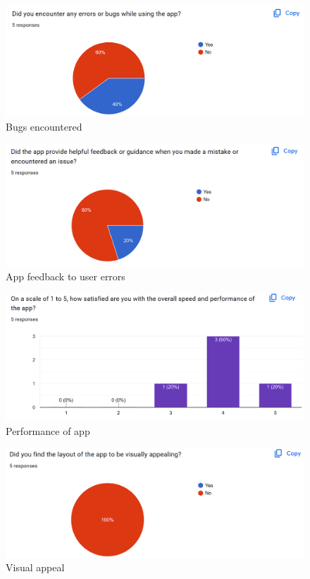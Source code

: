 \documentclass[12pt, titlepage]{article}
\begin{document}
\begin{figure}[H]
    \centering
    \includegraphics[width=1\linewidth]{Usability_3.png}
    \caption{Bugs encountered}
    \label{fig: Bugs encountered}
\end{figure}

\begin{figure}[H]
    \centering
    \includegraphics[width=1\linewidth]{Usability_4.png}
    \caption{App feedback to user errors}
    \label{fig: App feedback to user errors}
\end{figure}

\begin{figure}[H]
    \centering
    \includegraphics[width=1\linewidth]{Usability_5.png}
    \caption{Performance of app}
    \label{fig: Performance of app}
\end{figure}

\begin{figure}[H]
    \centering
    \includegraphics[width=1\linewidth]{Usability_6.png}
    \caption{Visual appeal}
    \label{fig: Visual appeal}
\end{figure}
\end{document}
